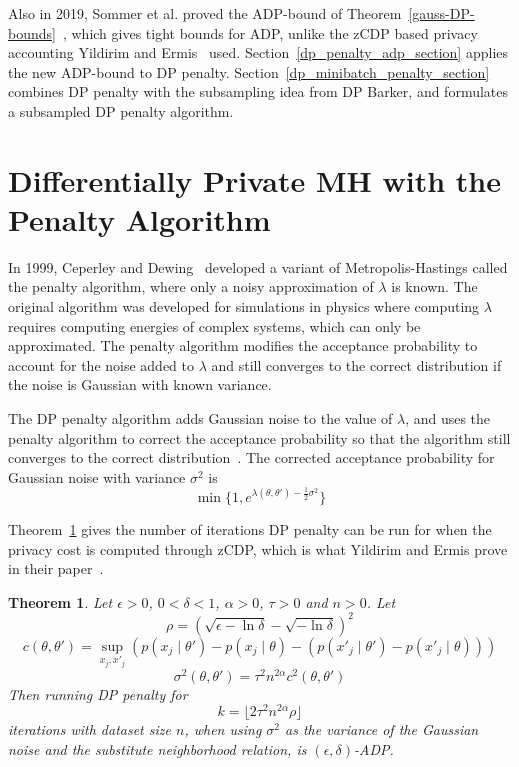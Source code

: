 \documentclass[english,twoside,openright]{HYgraduMLDS}
\newtheorem{theorem}{Theorem}
\begin{document}
Also in 2019, Sommer et al. proved the ADP-bound of
Theorem~\ref{gauss-DP-bounds}~\cite{Sommer2019}, which gives tight bounds for
ADP, unlike the zCDP based privacy accounting Yildirim and
Ermis~\cite{YildirimE19} used. Section~\ref{dp_penalty_adp_section} applies
the new ADP-bound to DP penalty.
Section~\ref{dp_minibatch_penalty_section} combines DP penalty with the
subsampling idea from DP Barker, and formulates a subsampled DP penalty
algorithm.

\section{Differentially Private MH with the Penalty Algorithm}\label{dp_penalty_section}

In 1999, Ceperley and Dewing~\cite{CeD99} developed a variant of 
Metropolis-Hastings called the penalty 
algorithm, where only a noisy approximation of \(\lambda\) is known. The
original algorithm was
developed for simulations in physics where computing \(\lambda\)
requires computing energies of complex systems, which can only be approximated.
The penalty algorithm modifies the acceptance probability to account for the 
noise added to \(\lambda\) and still converges to the correct distribution if 
the noise is Gaussian with known variance.

The DP penalty algorithm adds Gaussian noise to the value of \(\lambda\), and 
uses the penalty algorithm to correct the acceptance probability so that 
the algorithm still converges to the correct distribution~\cite{YildirimE19}.
The corrected acceptance probability for Gaussian noise with variance 
\(\sigma^2\) is 
\[
    \min\{1, e^{\lambda(\theta, \theta') - \frac{1}{2}\sigma^2}\}
\]

Theorem~\ref{DP_penalty_theorem_zcdp} gives the number of iterations DP penalty 
can be run for when the privacy cost is computed through zCDP, which is 
what Yildirim and Ermis prove in their paper~\cite{YildirimE19}.

\begin{theorem}\label{DP_penalty_theorem_zcdp}
  Let \(\epsilon > 0\), \(0 < \delta < 1\), \(\alpha > 0\), \(\tau > 0\) and
  \(n > 0\).
    Let
    \[
        \rho = (\sqrt{\epsilon - \ln \delta} - \sqrt{-\ln \delta})^2
    \]
    \[
        c(\theta, \theta') = \sup_{x_j, x'_j} (p(x_j\mid \theta') - p(x_j\mid \theta) 
        - (p(x'_j\mid \theta') - p(x'_j\mid \theta)))
    \]
    \[
        \sigma^2(\theta, \theta') = \tau^2 n^{2\alpha}c^2(\theta, \theta')
    \]
    Then running DP penalty for
    \[
        k = \lfloor 2\tau^2 n^{2\alpha} \rho\rfloor
    \]
    iterations with dataset size \(n\), when using \(\sigma^2\) as the
    variance of the Gaussian noise
    and the substitute neighborhood relation, is \((\epsilon, \delta)\)-ADP.
\end{theorem}
\end{document}

